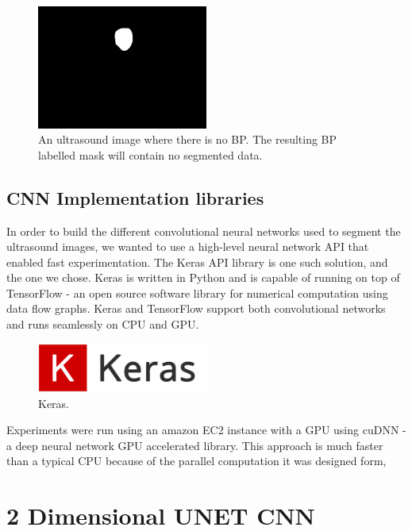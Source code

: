 \documentclass[letterpaper]{article}
\begin{document}
 \begin{figure}[H]
  \centerline{\includegraphics[width=0.5\textwidth]{Images/1_4_mask.png}}
  \caption{An ultrasound image where there is no BP. The resulting BP labelled mask will contain no segmented data.}
  \label{fig:BPMask}
\end{figure}

\subsection{CNN Implementation libraries}
In order to build the different convolutional neural networks used to segment the ultrasound images, we wanted to use a high-level neural network API that enabled fast experimentation. The Keras API library is one such solution, and the one we chose. Keras is written in Python and is capable of running on top of TensorFlow - an open source software library for numerical computation using data flow graphs. Keras and TensorFlow support both convolutional networks and runs seamlessly on CPU and GPU. 

 \begin{figure}[H]
  \centerline{\includegraphics[width=0.5\textwidth]{Images/Keras.png}}
  \caption{Keras.}
  \label{fig:keras}
\end{figure}

Experiments were run using an amazon EC2 instance with a GPU using cuDNN - a deep neural network GPU accelerated library. This approach is much faster than a typical CPU because of the parallel computation it was designed form,

\section{2 Dimensional UNET CNN}
\end{document}
